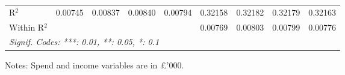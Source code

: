\begin{table}[htbp]
\begin{threeparttable}[b]
\begin{tabular}{lcccccccc}
         R$^2$                     & 0.00745         & 0.00837         & 0.00840         & 0.00794         & 0.32158         & 0.32182         & 0.32179         & 0.32163\\  
         Within R$^2$              &                 &                 &                 &                 & 0.00769         & 0.00803         & 0.00799         & 0.00776\\  
         \midrule \midrule
         \multicolumn{9}{l}{\emph{Signif. Codes: ***: 0.01, **: 0.05, *: 0.1}}\\
      \end{tabular}
      
      \begin{tablenotes}\footnotesize
         \item Notes: Spend and income variables are in \pounds'000.
      \end{tablenotes}
   \end{threeparttable}
\end{table}


